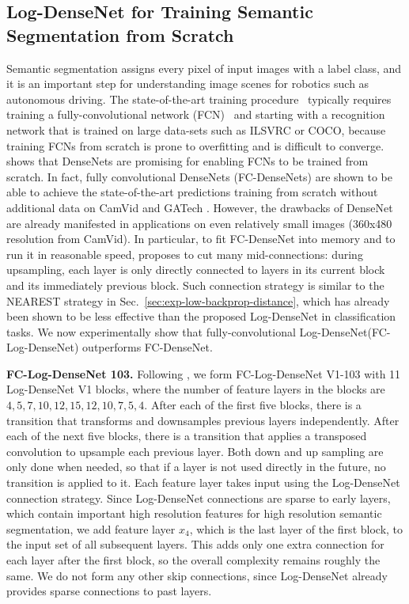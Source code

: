 \documentclass{article}
\newcommand{\logdense}{Log-DenseNet\xspace}
\newcommand{\nearest}{NEAREST\xspace}
\begin{document}
\subsection{\logdense for Training Semantic Segmentation from Scratch}
\label{sec:exp-fcdense}

Semantic segmentation assigns every pixel of input images with a label class, and it is an important step for understanding image scenes for robotics such as autonomous driving. The state-of-the-art training procedure~\citep{pspnet, deeplab} typically requires training a fully-convolutional network (FCN)~\citep{fcn} and starting with a recognition network that is trained on large data-sets such as ILSVRC or COCO, because training FCNs from scratch is prone to overfitting and is difficult to converge.
\cite{fcdense} shows that DenseNets are promising for enabling FCNs to be trained from scratch. In fact, fully convolutional DenseNets (FC-DenseNets) are shown to be able to achieve the state-of-the-art predictions training from scratch without additional data on CamVid \citep{camvid-dataset} and GATech \citep{gatech-dataset}. However, the drawbacks of DenseNet are already manifested in applications on even relatively small images (360x480 resolution from CamVid). In particular, to fit FC-DenseNet into memory and to run it in reasonable speed, \cite{fcdense} proposes to cut many mid-connections: during upsampling, each layer is only directly connected to layers in its current block and its immediately previous block. Such connection strategy is similar to the \nearest strategy in Sec.~\ref{sec:exp-low-backprop-distance}, which has already been shown to be less effective than the proposed \logdense in classification tasks. We now experimentally show that fully-convolutional \logdense (FC-\logdense) outperforms FC-DenseNet.

\textbf{FC-\logdense 103.} Following \citep{fcdense}, we form FC-\logdense V1-103 with 11 \logdense V1 blocks, where the number of feature layers in the blocks are $4, 5, 7, 10, 12, 15, 12, 10, 7, 5, 4$. After each of the first five blocks, there is a transition that transforms and downsamples previous layers independently. After each of the next five blocks, there is a transition that applies a transposed convolution to upsample each previous layer. Both down and up sampling are only done when needed, so that if a layer is not used directly in the future, no transition is applied to it. Each feature layer takes input using the \logdense connection strategy. Since \logdense connections are sparse to early layers, which contain important high resolution features for high resolution semantic segmentation, we add feature layer $x_4$, which is the last layer of the first block, to the input set of all subsequent layers. This adds only one extra connection for each layer after the first block, so the overall complexity remains roughly the same. 
We do not form any other skip connections, since \logdense  already provides sparse connections to past layers. 
 
\end{document}
